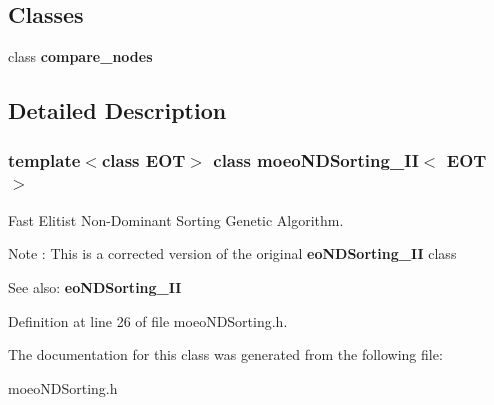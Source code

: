 \subsection*{Classes}
\begin{CompactItemize}
\item 
class {\bf compare\_\-nodes}
\end{CompactItemize}


\subsection{Detailed Description}
\subsubsection*{template$<$class EOT$>$ class moeo\-NDSorting\_\-II$<$ EOT $>$}

Fast Elitist Non-Dominant Sorting Genetic Algorithm. 

Note : This is a corrected version of the original {\bf eo\-NDSorting\_\-II} class\begin{Desc}
\item[See also:]{\bf eo\-NDSorting\_\-II} \end{Desc}




Definition at line 26 of file moeo\-NDSorting.h.

The documentation for this class was generated from the following file:\begin{CompactItemize}
\item 
moeo\-NDSorting.h\end{CompactItemize}
